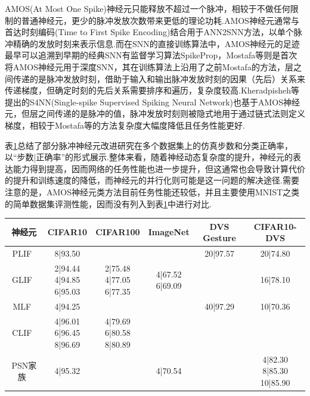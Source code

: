 \documentclass{SCIS2020cn}
\begin{document}
AMOS(At Most One Spike)神经元只能释放不超过一个脉冲，相较于不做任何限制的普通神经元，更少的脉冲发放次数带来更低的理论功耗.AMOS神经元通常与首达时刻编码(Time to First Spike Encoding)结合用于ANN2SNN方法\cite{8351295}，以单个脉冲精确的发放时刻来表示信息.而在SNN的直接训练算法中，AMOS神经元的足迹最早可以追溯到早期的经典SNN有监督学习算法SpikeProp\cite{BOHTE200217}，Mostafa等\cite{8050527}则是首次将AMOS神经元用于深度SNN，其在训练算法上沿用了之前Mostafa\cite{mostafa2017supervised}的方法，层之间传递的是脉冲发放时刻，借助于输入和输出脉冲发放时刻的因果（先后）关系来传递梯度，但确定时刻的先后关系需要排序和遍历，复杂度较高.Kheradpisheh等\cite{kheradpisheh2020temporal}提出的S4NN(Single-spike Supervised Spiking Neural Network)也基于AMOS神经元，但层之间传递的是脉冲的值，脉冲发放时刻则被隐式地用于通过链式法则定义梯度，相较于Mostafa等\cite{8050527}的方法复杂度大幅度降低且任务性能更好.

表\ref{tab: neuron acc}总结了部分脉冲神经元改进研究在多个数据集上的仿真步数和分类正确率，以“步数|正确率”的形式展示.整体来看，随着神经动态复杂度的提升，神经元的表达能力得到提高，因而网络的任务性能也进一步提升，但这通常也会导致计算代价的提升和训练速度的降低，而神经元的并行化则可能是这一问题的解决途径.需要注意的是，AMOS神经元类方法目前任务性能还较低，并且主要使用MNIST之类的简单数据集评测性能，因而没有列入到表\ref{tab: neuron acc}中进行对比.

\begin{table}[!t]
\label{tab: neuron acc}
\footnotesize
\tabcolsep 18pt %
\begin{tabular*}{\textwidth}{cccccc}
    \toprule
神经元 & CIFAR10 & CIFAR100 & ImageNet & DVS Gesture & CIFAR10-DVS \\ \hline
PLIF~\cite{fang2021incorporating} & 8|93.50 & & & 20|97.57 &20|74.80\\
\hline

GLIF~\cite{yao2022glif} & \makecell[c]{2|94.44\\4|94.85\\6|95.03} &\makecell[c]{2|75.48\\4|77.05\\6|77.35} &\makecell[c]{4|67.52\\6|69.09}  & &16|78.10 \\
\hline

MLF~\cite{ijcai2022p343} & 4|94.25 & & &40|97.29 & 10|70.36\\
\hline

CLIF~\cite{huang2024clif} & \makecell[c]{4|96.01\\6|96.45\\8|96.69} &\makecell[c]{4|79.69\\6|80.58\\8|80.89} & & & \\
\hline
PSN家族~\cite{fang2023parallel} &4|95.32 & &4|70.54 & &\makecell[c]{4|82.30\\8|85.30\\10|85.90}\\
    \bottomrule
\end{tabular*}
\end{table}
\end{document}
